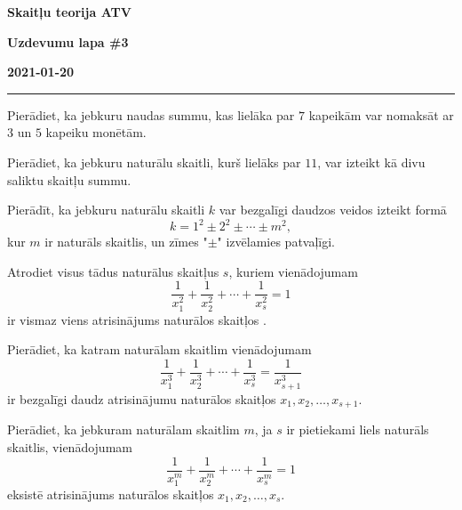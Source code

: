 \documentclass[a4paper,12pt]{article}
\begin{document}
\clearpage
\begin{center}
\parbox{3.5cm}{\flushleft\bf Skaitļu teorija \newline ATV} \hfill {\bf\LARGE Uzdevumu lapa \#3} \hfill \parbox{3.5cm}{\flushright\bf 2021-01-20} %
\end{center}

\hrule



\vspace{10pt}
\begin{problem}
Pierādiet, ka jebkuru naudas summu, kas lielāka par $7$ kapeikām var nomaksāt ar $3$ un $5$ kapeiku monētām.
\end{problem}



\vspace{10pt}
\begin{problem}
Pierādiet, ka jebkuru naturālu skaitli, kurš lielāks par $11$, var izteikt kā divu saliktu skaitļu summu.
\end{problem}



\vspace{10pt}
\begin{problem}
Pierādīt, ka jebkuru naturālu skaitli $k$ var bezgalīgi daudzos veidos izteikt formā
$$k = 1^2 \pm 2^2 \pm  \cdots \pm m^2 ,$$
kur $m$ ir naturāls skaitlis, un zīmes "$\pm$" izvēlamies patvaļīgi.
\end{problem}



\vspace{10pt}
\begin{problem}
Atrodiet visus tādus naturālus skaitļus $s$, kuriem vienādojumam
$$\frac{1}{x_1^2} + \frac{1}{x_2^2} + \cdots + \frac{1}{x_s^2} = 1$$	 
ir vismaz viens atrisinājums naturālos skaitļos  .
\end{problem}

\vspace{10pt}
\begin{problem}
Pierādiet, ka katram naturālam skaitlim   vienādojumam
$$\frac{1}{x_1^3} + \frac{1}{x_2^3} + \cdots + \frac{1}{x_s^3} = \frac{1}{x_{s+1}^3}$$
ir bezgalīgi daudz atrisinājumu naturālos skaitļos $x_1,x_2,\ldots,x_{s+1}$.
\end{problem}

\vspace{10pt}
\begin{problem}
Pierādiet, ka jebkuram naturālam skaitlim $m$, ja $s$ ir pietiekami liels naturāls skaitlis, vienādojumam
$$\frac{1}{x_1^m} + \frac{1}{x_2^m} + \cdots + \frac{1}{x_s^m} = 1$$	 
eksistē atrisinājums naturālos skaitļos $x_1,x_2,\ldots,x_{s}$.
\end{problem}
\end{document}
